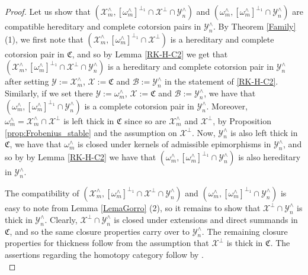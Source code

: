 \documentclass[10pt,reqno]{amsart}
\numberwithin{equation}{section}
\theoremstyle{remark}
\newcommand{\C}{\mathfrak{C}}
\newcommand{\X}{\mathcal{X}}
\begin{document}
\begin{proof}
Let us show that $(\mathcal{X}^\wedge_m, [\omega^\wedge_m]^{\perp_1} \cap \mathcal{X}^\perp \cap \mathcal{Y}^\wedge_n)$ and $(\omega^\wedge_m,[\omega^\wedge_m]^{\perp_1} \cap \mathcal{Y}^\wedge_n)$ are compatible hereditary and complete cotorsion pairs in $\mathcal{Y}^\wedge_n$. By Theorem \ref{Family} (1), we first note that $(\mathcal{X}^\wedge_m, [\omega^\wedge_m]^{\perp_1} \cap \mathcal{X}^\perp)$ is a hereditary and complete cotorsion pair in $\C$, and so by Lemma \ref{RK-H-C2} we get that $(\mathcal{X}^\wedge_m, [\omega^\wedge_m]^{\perp_1} \cap \mathcal{X}^\perp \cap \mathcal{Y}^\wedge_n)$ is a hereditary and complete cotorsion pair in $\mathcal{Y}^\wedge_n$ after setting $\mathcal{Y} := \mathcal{X}^\wedge_m$, $\mathcal{X} := \C$ and $\mathcal{B} := \mathcal{Y}^\wedge_n$ in the statement of \ref{RK-H-C2}. Similarly, if we set there $\mathcal{Y} := \omega^\wedge_m$, $\mathcal{X} := \C$ and $\mathcal{B} := \mathcal{Y}^\wedge_n$, we have that $(\omega^\wedge_m,[\omega^\wedge_m]^{\perp_1} \cap \mathcal{Y}^\wedge_n)$ is a complete cotorsion pair in $\mathcal{Y}^\wedge_n$. Moreover, $\omega^\wedge_m = \X^\wedge_m \cap \X^\perp$ is left thick in $\C$ since so are $\X^\wedge_m$ and $\X^\perp$, by Proposition \ref{prop:Frobenius_stable} and the assumption on $\X^\perp$. Now, $\mathcal{Y}^\wedge_n$ is also left thick in $\C$, we have that $\omega^\wedge_m$ is closed under kernels of admissible epimorphisms in $\mathcal{Y}^\wedge_n$, and so by by Lemma \ref{RK-H-C2} we have that $(\omega^\wedge_m,[\omega^\wedge_m]^{\perp_1} \cap \mathcal{Y}^\wedge_n)$ is also hereditary in $\mathcal{Y}^\wedge_n$.

The compatibility of $(\mathcal{X}^\wedge_m, [\omega^\wedge_m]^{\perp_1} \cap \mathcal{X}^\perp \cap \mathcal{Y}^\wedge_n)$ and $(\omega^\wedge_m,[\omega^\wedge_m]^{\perp_1} \cap \mathcal{Y}^\wedge_n)$ is easy to note from Lemma \ref{LemaGorro} (2), so it remains to show that $\mathcal{X}^\perp \cap \mathcal{Y}^\wedge_n$ is thick in $\mathcal{Y}^\wedge_n$. Clearly, $\mathcal{X}^\perp \cap \mathcal{Y}^\wedge_n$ is closed under extensions and direct summands in $\C$, and so the same closure properties carry over to $\mathcal{Y}^\wedge_n$. The remaining closure properties for thickness follow from the assumption that $\mathcal{X}^\perp$ is thick in $\C$. The assertions regarding the homotopy category follow by \cite[Prop. 5.2, Corolls. 4.8 \& 5.4]{GillespieExact}. \\
\end{proof}
\end{document}
